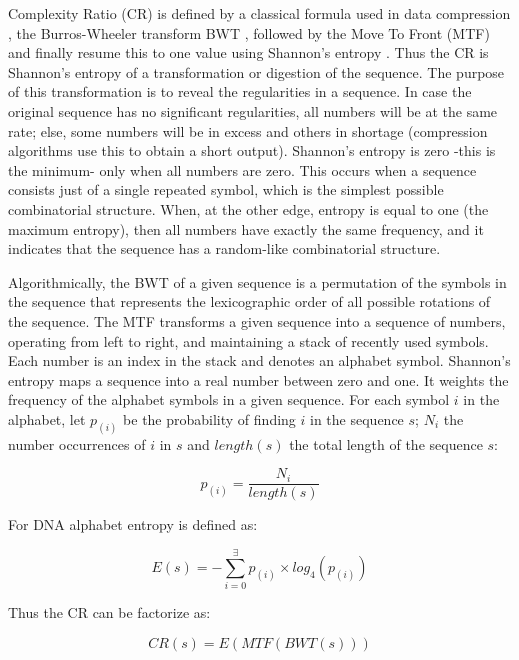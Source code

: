 Complexity Ratio (CR) is defined by a classical formula used in data
compression \cite{Adjeroh2008}, the Burros-Wheeler transform BWT
\cite{Burrows1994}, followed by the Move To Front (MTF)
\cite{Ryabko1980} and finally resume this to one value using Shannon's
entropy \cite{Shannon1948}. Thus the CR is Shannon's entropy of a
transformation or digestion of the sequence. The purpose of this
transformation is to reveal the regularities in a sequence. In case
the original sequence has no significant regularities, all numbers
will be at the same rate; else, some numbers will be in excess and
others in shortage (compression algorithms use this to obtain a short
output). Shannon's entropy is zero -this is the minimum- only when all
numbers are zero. This occurs when a sequence consists just of a
single repeated symbol, which is the simplest possible combinatorial
structure. When, at the other edge, entropy is equal to one (the
maximum entropy), then all numbers have exactly the same frequency,
and it indicates that the sequence has a random-like combinatorial
structure.

Algorithmically, the BWT of a given sequence is a permutation of the
symbols in the sequence that represents the lexicographic order of all
possible rotations of the sequence. The MTF transforms a given
sequence into a sequence of numbers, operating from left to right, and
maintaining a stack of recently used symbols. Each number is an index
in the stack and denotes an alphabet symbol. Shannon's entropy maps a
sequence into a real number between zero and one. It weights the
frequency of the alphabet symbols in a given sequence. For each symbol
$i$ in the alphabet, let $p_{(i)}$ be the probability of finding $i$
in the sequence $s$; $N_i$ the number occurrences of $i$ in $s$ and
$length(s)$ the total length of the sequence $s$:

\begin{equation} \label{eq:prob_seq}
p_{(i)} = \frac {N_i}{length(s)}
\end{equation}

For DNA alphabet entropy is defined as:

\begin{equation} \label{eq:entropy}
E(s) = -\sum_{i=0}^{\exists}p_{(i)} \times log_4(p_{(i)})
\end{equation}

Thus the CR can be factorize as:

\begin{equation} \label{eq:cr}
CR(s) = E(MTF(BWT(s)))
\end{equation}

